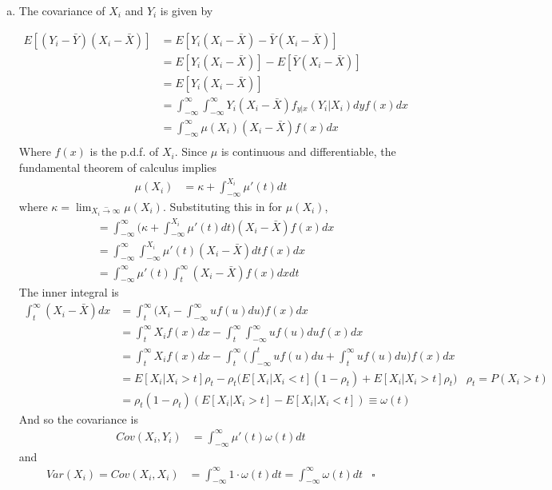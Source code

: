 \documentclass[11pt]{article}
\begin{document}
\begin{enumerate}[a)]

	\item The covariance of $X_i$ and $Y_i$ is given by

	\begin{align*}
		E[(Y_i - \bar{Y})(X_i - \bar{X})] &=  E[Y_i(X_i - \bar{X}) - \bar{Y}(X_i - \bar{X})] \\
		&= E[Y_i(X_i - \bar{X})]- E[\bar{Y}(X_i - \bar{X})] \\
		&= E[Y_i(X_i - \bar{X})] \\
		&= \int_{-\infty}^{\infty} \int_{-\infty}^{\infty} Y_i (X_i - \bar{X}) f_{y|x}(Y_i|X_i)dy f(x)dx \\
		&= \int_{-\infty}^{\infty} \mu(X_i) (X_i - \bar{X}) f(x)dx \\
	\end{align*}
	Where $f(x)$ is the p.d.f. of $X_i$. Since $\mu$ is continuous and differentiable, the fundamental theorem of calculus implies
	\begin{align*}
		\mu(X_i) &= \kappa + \int_{-\infty}^{X_i}\mu'(t) dt
	\end{align*}
	where $\kappa = \lim_{X_i \xrightarrow -\infty} \mu(X_i)$. Substituting this in for $\mu(X_i)$,
	\begin{align*}
		&= \int_{-\infty}^{\infty} \Big( \kappa + \int_{-\infty}^{X_i}\mu'(t) dt \Big) (X_i - \bar{X}) f(x) dx \\
		&= \int_{-\infty}^{\infty} \int_{-\infty}^{X_i}\mu'(t) (X_i - \bar{X}) dt f(x)dx \\
		&= \int_{-\infty}^{\infty} \mu'(t) \int_{t}^{\infty } (X_i - \bar{X}) f(x)dxdt
	\end{align*}
	The inner integral is
	\begin{align*}
		\int_{t}^{\infty} (X_i - \bar{X}) dx &= \int_{t}^{\infty} \bigg( X_i - \int_{-\infty}^{\infty} u f(u)du \bigg) f(x)dx \\
		&= \int_{t}^{\infty} X_i f(x)dx - \int_{t}^{\infty} \int_{-\infty}^{\infty} u f(u)du f(x)dx \\
		&= \int_{t}^{\infty} X_i f(x)dx - \int_{t}^{\infty} \bigg( \int_{-\infty}^{t} u f(u)du + \int_{t}^{\infty} u f(u)du \bigg) f(x)dx \\
		&= E[X_i | X_i > t] \rho_t - \rho_t \bigg( E[X_i | X_i < t] (1 - \rho_t) + E[X_i | X_i > t] \rho_t \bigg) &\mbox{$\rho_t = P(X_i > t)$} \\
		&= \rho_t(1-\rho_t) (E[X_i | X_i > t] - E[X_i | X_i < t]) \equiv \omega(t)
	\end{align*}
	And so the covariance is
	\begin{align*}
		Cov(X_i,Y_i) &= \int_{-\infty}^{\infty} \mu'(t) \omega(t) dt
	\end{align*}
	and
	\begin{align*}
		Var(X_i) = Cov(X_i,X_i) &= \int_{-\infty}^{\infty} 1 \cdot \omega(t) dt = \int_{-\infty}^{\infty} \omega(t) dt &\square
	\end{align*}	


\end{enumerate}
\end{document}
